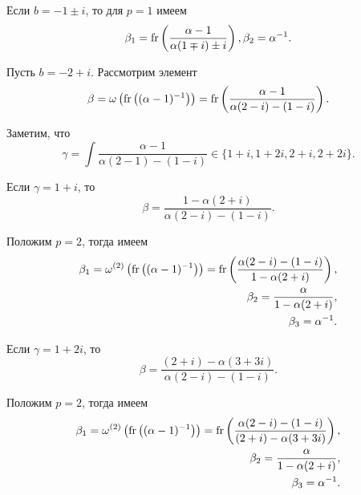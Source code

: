 \documentclass[_00_dissertation.tex]{subfiles}
\begin{document}
\begin{example}
    Если $b = -1 \pm i$, то для $p = 1$ имеем
    \begin{equation*}
        \beta_1 = \textrm{fr}\left(\frac{\alpha - 1}{\alpha(1 \mp i) \pm i}\right), \beta_2 = \alpha^{-1}.
    \end{equation*}

    Пусть $b = -2 + i$. Рассмотрим элемент
    \begin{equation*}
        \beta = \omega\left(
            \textrm{fr}\left((\alpha - 1)^{-1}\right)
        \right) = \textrm{fr}\left(\frac{\alpha - 1}{\alpha(2 - i) - (1 - i)}\right).
    \end{equation*}

    Заметим, что
    \begin{equation*}
        \gamma = \int{\frac{\alpha - 1}{\alpha(2 - 1) - (1 - i)}} \in \{1 + i, 1 + 2i, 2 + i, 2 + 2i\}.
    \end{equation*}

    Если $\gamma = 1 + i$, то
    \begin{equation*}
        \beta = \frac{1 - \alpha(2 + i)}{\alpha(2 - i) - (1 - i)}.
    \end{equation*}

    Положим $p = 2$, тогда имеем
    \begin{equation*}
        \begin{split}
            \beta_1 = \omega^{(2)}\left(
                \textrm{fr}\left((\alpha-1)^{-1}\right)
            \right) = \textrm{fr}\left(\frac{\alpha(2-i)-(1-i)}{1-\alpha(2+i)}\right),\\
            \beta_2 = \frac{\alpha}{1-\alpha(2+i)},\\
            \beta_3 = \alpha^{-1}.
        \end{split}
    \end{equation*}

    Если $\gamma = 1 + 2i$, то
    \begin{equation*}
        \beta = \frac{(2 + i) - \alpha(3 + 3i)}{\alpha(2 - i) - (1 - i)}.
    \end{equation*}

    Положим $p = 2$, тогда имеем
    \begin{equation*}
        \begin{split}
            \beta_1 = \omega^{(2)}\left(
                \textrm{fr}\left((\alpha-1)^{-1}\right)
            \right) = \textrm{fr}\left(\frac{\alpha(2 - i) - (1 - i)}{(2 + i) - \alpha(3 + 3i)}\right),\\
            \beta_2 = \frac{\alpha}{1 - \alpha(2 + i)},\\
            \beta_3 = \alpha^{-1}.
        \end{split}
    \end{equation*}


\end{example}
\end{document}
